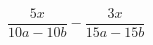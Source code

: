 \begin{ex}
	\begin{condition}
		\( \dfrac{5x}{10a-10b}-\dfrac{3x}{15a-15b} \)
	\end{condition}
\end{ex}